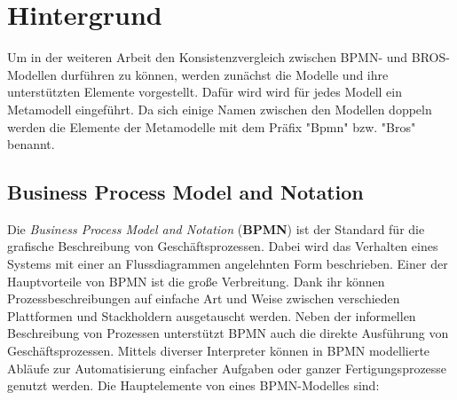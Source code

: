 \chapter{Hintergrund}
\label{chap:background}

Um in der weiteren Arbeit den Konsistenzvergleich zwischen BPMN- und BROS-Modellen durführen zu können, werden zunächst die Modelle und ihre unterstützten Elemente vorgestellt.
Dafür wird wird für jedes Modell ein Metamodell eingeführt.
Da sich einige Namen zwischen den Modellen doppeln werden die Elemente der Metamodelle mit dem Präfix "Bpmn" bzw. "Bros" benannt.

\section{Business Process Model and Notation}

Die \emph{Business Process Model and Notation} (\textbf{BPMN}) ist der Standard für die grafische Beschreibung von Geschäftsprozessen.
Dabei wird das Verhalten eines Systems mit einer an Flussdiagrammen angelehnten Form beschrieben.
Einer der Hauptvorteile von BPMN ist die große Verbreitung.
Dank ihr können Prozessbeschreibungen auf einfache Art und Weise zwischen verschieden Plattformen und Stackholdern ausgetauscht werden.
Neben der informellen Beschreibung von Prozessen unterstützt BPMN auch die direkte Ausführung von Geschäftsprozessen.
Mittels diverser Interpreter können in BPMN modellierte Abläufe zur Automatisierung einfacher Aufgaben oder ganzer Fertigungsprozesse genutzt werden.
Die Hauptelemente von eines BPMN-Modelles sind:

